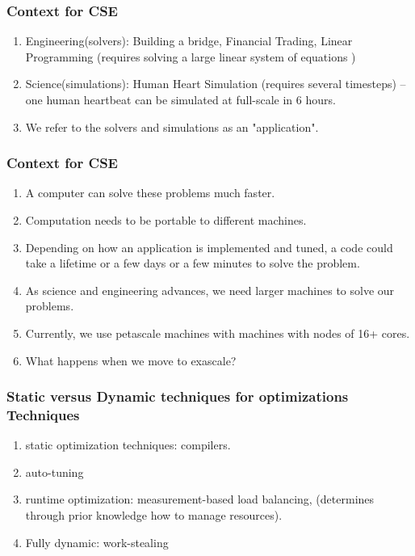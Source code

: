 \begin{frame}[Problems] 
\frametitle{Context for CSE}
\begin{enumerate} 
\item Engineering(solvers): Building a bridge, Financial Trading, Linear Programming (requires solving a large linear system of equations )
\item Science(simulations): Human Heart Simulation (requires several timesteps) -- one human heartbeat 
can be simulated at full-scale in 6 hours.
\item We refer to the solvers and simulations as an "application". 
\end{enumerate} 
\end{frame} 

\begin{frame}
\frametitle{Context for CSE}
\begin{enumerate}
\item A computer can solve these problems much faster. 
\item Computation needs to be portable to different machines.  
\item Depending on how an application is implemented and tuned,
      a code could take a lifetime or a few days or a few minutes 
      to solve the problem.  
\item As science and engineering advances, we need larger machines to solve our problems. 
\item Currently, we use petascale machines with machines with nodes of 16+ cores.  
\item What happens when we move to exascale?  
\end{enumerate} 
\end{frame} 

\begin{frame}
\frametitle{Static versus Dynamic techniques for optimizations Techniques}
\begin{enumerate}
\item static optimization techniques: compilers. 
\item auto-tuning 
\item runtime optimization: measurement-based load balancing, 
(determines through prior knowledge how to manage resources). 
\item Fully dynamic:  work-stealing  
\end{enumerate} 
\end{frame}   

